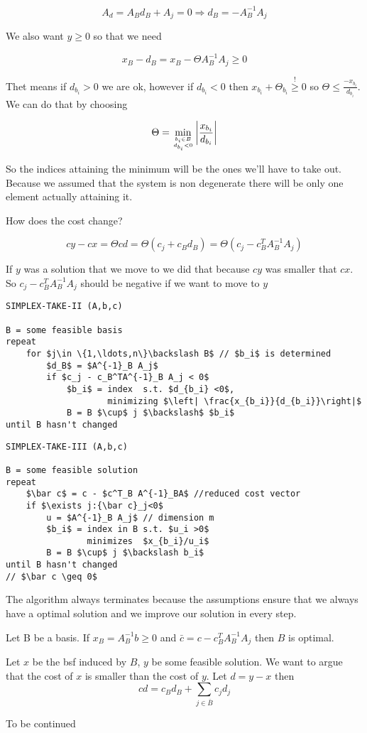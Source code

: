 \[A_d = A_B d_B+A_j = 0 \Rightarrow d_B = -A^{-1}_B A_j\]

We also want $y\geq 0$ so that we need

\[x_B - d_B = x_B - \Theta A_B^{-1} A_j \geq 0\]

Thet means if $d_{b_i}>0$ we are ok, however if $d_{b_i} <0$ then $x_{b_i} +\Theta_{b_i} \stackrel{!}{\geq} 0$ so $\Theta \leq \frac{-x_{b_i}}{d_{b_i}}$. We can do that by choosing

\[\Theta = \min_{{b_i\in B}\atop {d_{b_i} <0}} \left| \frac{x_{b_i}}{d_{b_i}}\right |\]

So the indices attaining the minimum will be the ones we'll have to take out. Because we assumed that the system is non degenerate there will be only one element actually attaining it. %

How does the cost change?

\[cy -cx = \Theta cd = \Theta(c_j+c_Bd_B) = \Theta(c_j - c_B^TA^{-1}_B A_j)\]

If $y$ was a solution that we move to we did that because $cy$ was smaller that $cx$. So $c_j - c_B^TA^{-1}_B A_j$ should be negative if we want to move to $y$

\begin{lstlisting}
SIMPLEX-TAKE-II (A,b,c)

B = some feasible basis
repeat 
    for $j\in \{1,\ldots,n\}\backslash B$ // $b_i$ is determined
        $d_B$ = $A^{-1}_B A_j$
        if $c_j - c_B^TA^{-1}_B A_j < 0$
            $b_i$ = index  s.t. $d_{b_i} <0$, 
                    minimizing $\left| \frac{x_{b_i}}{d_{b_i}}\right|$
            B = B $\cup$ j $\backslash$ $b_i$
until B hasn't changed
\end{lstlisting}


\begin{lstlisting}
SIMPLEX-TAKE-III (A,b,c)

B = some feasible solution
repeat
    $\bar c$ = c - $c^T_B A^{-1}_BA$ //reduced cost vector
    if $\exists j:{\bar c}_j<0$ 
        u = $A^{-1}_B A_j$ // dimension m
        $b_i$ = index in B s.t. $u_i >0$ 
                minimizes  $x_{b_i}/u_i$
        B = B $\cup$ j $\backslash b_i$ 
until B hasn't changed 
// $\bar c \geq 0$ 
\end{lstlisting}

The algorithm always terminates because the assumptions ensure that we always have a optimal solution and we improve our solution in every step.

\begin{thm}\label{Pr:simplexIIIopt} Let B be a basis. If $x_B=A^{-1}_Bb\geq 0$ and $\bar c=c-c_B^{T}A_B^{-1}A_j$ then $B$ is optimal.\end{thm}

\begin{pr} Let $x$ be the bsf induced by $B$, $y$ be some feasible solution. We want to argue that the cost of $x$ is smaller than the cost of $y$. Let $d=y-x$ then 
\[cd = c_Bd_B + \sum_{j\in \bar B} c_jd_j \] 

To be continued
\end{pr}